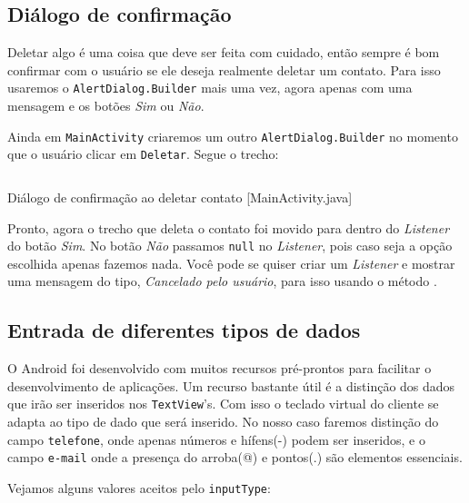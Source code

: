 \subsection{Diálogo de confirmação}

Deletar algo é uma coisa que deve ser feita com cuidado, então sempre é bom confirmar com
o usuário se ele deseja realmente deletar um contato. Para isso usaremos o \texttt{AlertDialog.Builder}
mais uma vez, agora apenas com uma mensagem e os botões \textit{Sim} ou \textit{Não}.


Ainda em \texttt{MainActivity} criaremos um outro \texttt{AlertDialog.Builder} no momento que o usuário
clicar em \texttt{Deletar}. Segue o trecho:

\begin{listing}[H]
  \inputminted[linenos=true,frame=bottomline,tabsize=3]{ java }{ source/MainActivity-9.java }
  \caption{Diálogo de confirmação ao deletar contato [MainActivity.java]}
\end{listing}

Pronto, agora o trecho que deleta o contato foi movido para dentro do \textit{Listener} do botão
\textit{Sim}. No botão \textit{Não} passamos \texttt{null} no \textit{Listener}, pois caso
seja a opção escolhida apenas fazemos nada. Você pode se quiser criar um \textit{Listener} e mostrar
uma mensagem do tipo, \textit{Cancelado pelo usuário}, para isso usando o método .


\subsection{Entrada de diferentes tipos de dados}

O Android foi desenvolvido com muitos recursos pré-prontos para facilitar o desenvolvimento de aplicações.
Um recurso bastante útil é a distinção dos dados que irão ser inseridos nos \texttt{TextView}'s. Com isso
o teclado virtual do cliente se adapta ao tipo de dado que será inserido. No nosso caso faremos distinção
do campo \texttt{telefone}, onde apenas números e hífens(-) podem ser inseridos, e o campo \texttt{e-mail}
onde a presença do arroba(@) e pontos(.) são elementos essenciais.

Vejamos alguns valores aceitos pelo \texttt{inputType}:

